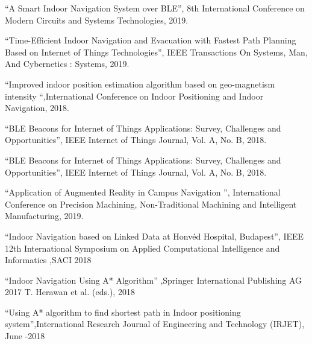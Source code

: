 ﻿\documentclass[a4paper, 12pt]{article}
\begin{document}
\begin{thebibliography}{21}
	“A Smart Indoor Navigation System over BLE”, 8th International Conference on Modern Circuits and Systems Technologies, 2019.
	
	“Time-Efﬁcient Indoor Navigation and Evacuation with Fastest Path Planning Based on Internet of Things Technologies”, IEEE Transactions On Systems, Man, And Cybernetics : Systems, 2019.
	
	“Improved indoor position estimation algorithm based on geo-magnetism intensity “,International Conference on Indoor Positioning and Indoor Navigation, 2018.
	
	“BLE Beacons for Internet of Things Applications: Survey, Challenges and Opportunities”, IEEE Internet of Things Journal, Vol. A, No. B, 2018.
	
	“BLE Beacons for Internet of Things Applications: Survey, Challenges and Opportunities”, IEEE Internet of Things Journal, Vol. A, No. B, 2018.
	
	
	“Application of Augmented Reality in Campus Navigation ”, International Conference on Precision Machining, Non-Traditional Machining and Intelligent Manufacturing, 2019.
	
	
	“Indoor Navigation based on Linked Data at Honvéd Hospital, Budapest”, IEEE 12th International Symposium on Applied Computational Intelligence and Informatics ,SACI 2018
	
	“Indoor Navigation Using A* Algorithm” ,Springer International Publishing AG 2017 T. Herawan et al. (eds.), 2018
	
	
	“Using A* algorithm to find shortest path in Indoor positioning system”,International Research Journal of Engineering and Technology (IRJET), June -2018
	
\end{thebibliography}
\end{document}
